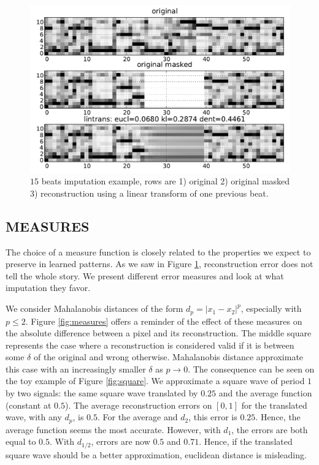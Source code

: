 \documentclass{article}
\begin{document}
\begin{figure}[t]
\begin{center}
\includegraphics[width=.95\columnwidth]{basic}
\end{center}
\caption{$15$ beats imputation example, rows are 1) original 2) original masked
3) reconstruction using a linear transform of one previous beat.
\label{fig:basic}}
\end{figure}

\subsection{MEASURES}
\label{ssec:measures}
The choice of a measure function is closely related to the properties
we expect to preserve in learned patterns. As we saw in Figure
\ref{fig:basic}, reconstruction error does not tell the whole story.
We present different error measures and look at what imputation they
favor.

We consider Mahalanobis distances of the form $d_p = |x_1-x_2|^p$, especially
with $p \leq 2$. Figure \ref{fig:measures} offers a reminder of the effect
of these measures on the absolute difference between a pixel and
its reconstruction. The middle square represents the case where a
reconstruction is considered valid if it is between some $\delta$ of
the original and wrong otherwise. Mahalanobis distance approximate
this case with an increasingly smaller $\delta$ as $p \rightarrow 0$.
The consequence can be seen on the toy example of 
Figure \ref{fig:square}. We approximate a square wave of period $1$
by two signals: the same square wave translated by $0.25$ and the
average function (constant at $0.5$). The average reconstruction 
errors on $[0,1]$ for the translated wave, with any $d_p$, is $0.5$.
For the average and $d_2$, this error is $0.25$.
Hence, the average function seems the most accurate. However,
with $d_1$, the errors are both equal to $0.5$. With $d_{1/2}$,
errors are now $0.5$ and $0.71$. Hence, if the translated square wave
should be a better approximation, euclidean distance is misleading.
\end{document}
